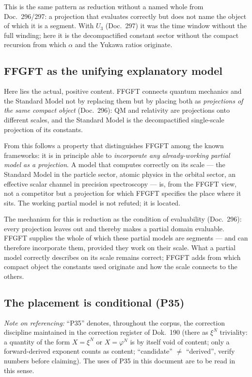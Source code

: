 This is the same pattern as reduction without a named whole from Doc.~296/297:
a projection that evaluates correctly but does not name the object of which it
is a segment. With $U_3$ (Doc.~297) it was the time window without the full
winding; here it is the decompactified constant sector without the compact
recursion from which $\alpha$ and the Yukawa ratios originate.

\subsection*{FFGFT as the unifying explanatory model}

Here lies the actual, positive content. FFGFT connects quantum mechanics and
the Standard Model not by replacing them but by placing both as
\emph{projections of the same compact object} (Doc.~296): QM and relativity
are projections onto different scales, and the Standard Model is the
decompactified single-scale projection of its constants.

From this follows a property that distinguishes FFGFT among the known
frameworks: it is in principle able to \emph{incorporate any already-working
partial model as a projection}. A model that computes correctly on its scale
--- the Standard Model in the particle sector, atomic physics in the orbital
sector, an effective scalar channel in precision spectroscopy --- is, from the
FFGFT view, not a competitor but a projection for which FFGFT specifies the
place where it sits. The working partial model is not refuted; it is located.

The mechanism for this is reduction as the condition of evaluability
(Doc.~296): every projection leaves out and thereby makes a partial domain
evaluable. FFGFT supplies the whole of which these partial models are
segments --- and can therefore incorporate them, provided they work on their
scale. What a partial model correctly describes on its scale remains correct;
FFGFT adds from which compact object the constants used originate and how the
scale connects to the others.

\subsection*{The placement is conditional (P35)}

\noindent\emph{Note on referencing:} \enquote{P35} denotes, throughout the
corpus, the correction discipline maintained in the correction register of
Dok.~190 (there as $\xi^N$ triviality: a quantity of the form $X = \xi^N$ or
$X = \varphi^N$ is by itself void of content; only a forward-derived exponent
counts as content; \enquote{candidate} $\neq$ \enquote{derived}, verify
numbers before claiming). The uses of P35 in this document are to be read in
this sense.

